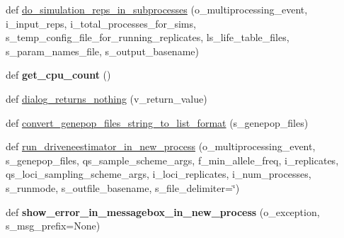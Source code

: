 \begin{DoxyCompactItemize}
\item 
def \hyperlink{namespacenegui_1_1pgutilities_a7dc2404b0e269d0b0848711c8271bb86}{do\+\_\+simulation\+\_\+reps\+\_\+in\+\_\+subprocesses} (o\+\_\+multiprocessing\+\_\+event, i\+\_\+input\+\_\+reps, i\+\_\+total\+\_\+processes\+\_\+for\+\_\+sims, s\+\_\+temp\+\_\+config\+\_\+file\+\_\+for\+\_\+running\+\_\+replicates, ls\+\_\+life\+\_\+table\+\_\+files, s\+\_\+param\+\_\+names\+\_\+file, s\+\_\+output\+\_\+basename)
\item 
def {\bfseries get\+\_\+cpu\+\_\+count} ()\hypertarget{namespacenegui_1_1pgutilities_a651d0e76f36897c5ca20e6d40d1a46a7}{}\label{namespacenegui_1_1pgutilities_a651d0e76f36897c5ca20e6d40d1a46a7}

\item 
def \hyperlink{namespacenegui_1_1pgutilities_aa839d4997d2bd2c15016c33cc7fce3b0}{dialog\+\_\+returns\+\_\+nothing} (v\+\_\+return\+\_\+value)
\item 
def \hyperlink{namespacenegui_1_1pgutilities_aed0f15b22462914445ffe1ec2a77cbc8}{convert\+\_\+genepop\+\_\+files\+\_\+string\+\_\+to\+\_\+list\+\_\+format} (s\+\_\+genepop\+\_\+files)
\item 
def \hyperlink{namespacenegui_1_1pgutilities_a177345979e44820072e37052d92bfd32}{run\+\_\+driveneestimator\+\_\+in\+\_\+new\+\_\+process} (o\+\_\+multiprocessing\+\_\+event, s\+\_\+genepop\+\_\+files, qs\+\_\+sample\+\_\+scheme\+\_\+args, f\+\_\+min\+\_\+allele\+\_\+freq, i\+\_\+replicates, qs\+\_\+loci\+\_\+sampling\+\_\+scheme\+\_\+args, i\+\_\+loci\+\_\+replicates, i\+\_\+num\+\_\+processes, s\+\_\+runmode, s\+\_\+outfile\+\_\+basename, s\+\_\+file\+\_\+delimiter=\char`\"{})
\item 
def {\bfseries show\+\_\+error\+\_\+in\+\_\+messagebox\+\_\+in\+\_\+new\+\_\+process} (o\+\_\+exception, s\+\_\+msg\+\_\+prefix=None)\hypertarget{namespacenegui_1_1pgutilities_a3f2675bc8eb3aae305ba8cc0c7df8d33}{}\label{namespacenegui_1_1pgutilities_a3f2675bc8eb3aae305ba8cc0c7df8d33}

\end{DoxyCompactItemize}

